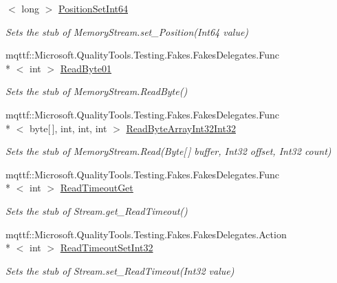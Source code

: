 \begin{DoxyCompactItemize}
$<$ long $>$ \hyperlink{class_system_1_1_i_o_1_1_fakes_1_1_stub_memory_stream_a5f67934ef0e617b3f8cc165052c01fab}{Position\-Set\-Int64}
\begin{DoxyCompactList}\small\item\em Sets the stub of Memory\-Stream.\-set\-\_\-\-Position(\-Int64 value)\end{DoxyCompactList}\item 
mqttf\-::\-Microsoft.\-Quality\-Tools.\-Testing.\-Fakes.\-Fakes\-Delegates.\-Func\\*
$<$ int $>$ \hyperlink{class_system_1_1_i_o_1_1_fakes_1_1_stub_memory_stream_a88c237ed4036c4705cdb0e0781e0e9d3}{Read\-Byte01}
\begin{DoxyCompactList}\small\item\em Sets the stub of Memory\-Stream.\-Read\-Byte()\end{DoxyCompactList}\item 
mqttf\-::\-Microsoft.\-Quality\-Tools.\-Testing.\-Fakes.\-Fakes\-Delegates.\-Func\\*
$<$ byte\mbox{[}$\,$\mbox{]}, int, int, int $>$ \hyperlink{class_system_1_1_i_o_1_1_fakes_1_1_stub_memory_stream_aad1d69cdf6c010264b1e68b8830d9ef7}{Read\-Byte\-Array\-Int32\-Int32}
\begin{DoxyCompactList}\small\item\em Sets the stub of Memory\-Stream.\-Read(\-Byte\mbox{[}$\,$\mbox{]} buffer, Int32 offset, Int32 count)\end{DoxyCompactList}\item 
mqttf\-::\-Microsoft.\-Quality\-Tools.\-Testing.\-Fakes.\-Fakes\-Delegates.\-Func\\*
$<$ int $>$ \hyperlink{class_system_1_1_i_o_1_1_fakes_1_1_stub_memory_stream_a489312ba446d7194d6d8d6f4b8cb6199}{Read\-Timeout\-Get}
\begin{DoxyCompactList}\small\item\em Sets the stub of Stream.\-get\-\_\-\-Read\-Timeout()\end{DoxyCompactList}\item 
mqttf\-::\-Microsoft.\-Quality\-Tools.\-Testing.\-Fakes.\-Fakes\-Delegates.\-Action\\*
$<$ int $>$ \hyperlink{class_system_1_1_i_o_1_1_fakes_1_1_stub_memory_stream_a77b11a8d7e0e665f8c1dfed8d49621ab}{Read\-Timeout\-Set\-Int32}
\begin{DoxyCompactList}\small\item\em Sets the stub of Stream.\-set\-\_\-\-Read\-Timeout(\-Int32 value)\end{DoxyCompactList}\item 

\end{DoxyCompactItemize}
